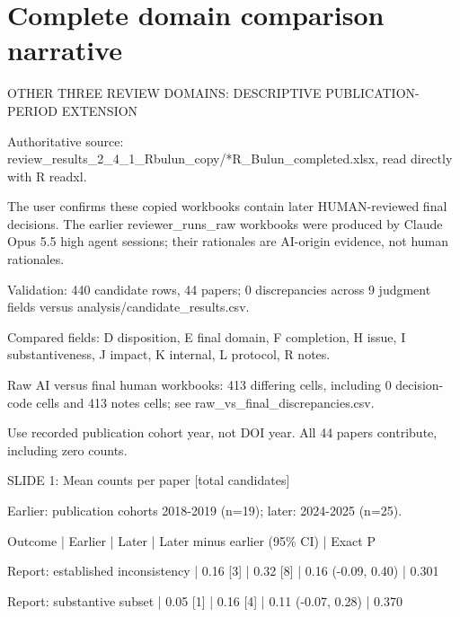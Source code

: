 \documentclass[10pt,a4paper]{article}
\begin{document}
\section{Complete domain comparison narrative}
OTHER THREE REVIEW DOMAINS: DESCRIPTIVE PUBLICATION-\allowbreak{}PERIOD EXTENSION\par
Authoritative source: review\_\allowbreak{}results\_\allowbreak{}2\_\allowbreak{}4\_\allowbreak{}1\_\allowbreak{}Rbulun\_\allowbreak{}copy/\allowbreak{}*R\_\allowbreak{}Bulun\_\allowbreak{}completed.\allowbreak{}xlsx, read directly with R readxl.\allowbreak{}\par
The user confirms these copied workbooks contain later HUMAN-\allowbreak{}reviewed final decisions.\allowbreak{} The earlier reviewer\_\allowbreak{}runs\_\allowbreak{}raw workbooks were produced by Claude Opus 5.\allowbreak{}5 high agent sessions; their rationales are AI-\allowbreak{}origin evidence, not human rationales.\allowbreak{}\par
Validation: 440 candidate rows, 44 papers; 0 discrepancies across 9 judgment fields versus analysis/\allowbreak{}candidate\_\allowbreak{}results.\allowbreak{}csv.\allowbreak{}\par
Compared fields: D disposition, E final domain, F completion, H issue, I substantiveness, J impact, K internal, L protocol, R notes.\allowbreak{}\par
Raw AI versus final human workbooks: 413 differing cells, including 0 decision-\allowbreak{}code cells and 413 notes cells; see raw\_\allowbreak{}vs\_\allowbreak{}final\_\allowbreak{}discrepancies.\allowbreak{}csv.\allowbreak{}\par
Use recorded publication cohort year, not DOI year.\allowbreak{} All 44 papers contribute, including zero counts.\allowbreak{}\par
SLIDE 1: Mean counts per paper [total candidates]\par
Earlier: publication cohorts 2018-\allowbreak{}2019 (n=19); later: 2024-\allowbreak{}2025 (n=25).\allowbreak{}\par
Outcome | Earlier | Later | Later minus earlier (95\% CI) | Exact P\par
Report: established inconsistency | 0.\allowbreak{}16 [3] | 0.\allowbreak{}32 [8] | 0.\allowbreak{}16 (-\allowbreak{}0.\allowbreak{}09, 0.\allowbreak{}40) | 0.\allowbreak{}301\par
Report: substantive subset | 0.\allowbreak{}05 [1] | 0.\allowbreak{}16 [4] | 0.\allowbreak{}11 (-\allowbreak{}0.\allowbreak{}07, 0.\allowbreak{}28) | 0.\allowbreak{}370\par
\end{document}
